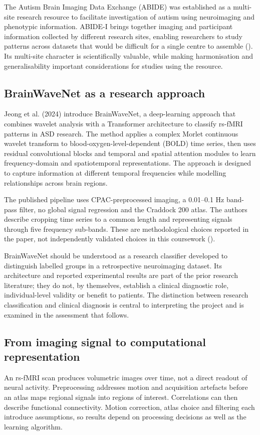 \documentclass[11pt,a4paper]{article}
\begin{document}
The Autism Brain Imaging Data Exchange (ABIDE) was established as a multi-site research resource to facilitate investigation of autism using neuroimaging and phenotypic information. ABIDE-I brings together imaging and participant information collected by different research sites, enabling researchers to study patterns across datasets that would be difficult for a single centre to assemble (\cite{dimartino2014,abidewebsite,abideharmonization2022}). Its multi-site character is scientifically valuable, while making harmonisation and generalisability important considerations for studies using the resource.

\subsection{BrainWaveNet as a research approach}
Jeong et al. (2024) introduce BrainWaveNet, a deep-learning approach that combines wavelet analysis with a Transformer architecture to classify rs-fMRI patterns in ASD research. The method applies a complex Morlet continuous wavelet transform to blood-oxygen-level-dependent (BOLD) time series, then uses residual convolutional blocks and temporal and spatial attention modules to learn frequency-domain and spatiotemporal representations. The approach is designed to capture information at different temporal frequencies while modelling relationships across brain regions.

The published pipeline uses CPAC-preprocessed imaging, a 0.01--0.1 Hz band-pass filter, no global signal regression and the Craddock 200 atlas. The authors describe cropping time series to a common length and representing signals through five frequency sub-bands. These are methodological choices reported in the paper, not independently validated choices in this coursework (\cite{jeong2024,abraham2017}).

BrainWaveNet should be understood as a research classifier developed to distinguish labelled groups in a retrospective neuroimaging dataset. Its architecture and reported experimental results are part of the prior research literature; they do not, by themselves, establish a clinical diagnostic role, individual-level validity or benefit to patients. The distinction between research classification and clinical diagnosis is central to interpreting the project and is examined in the assessment that follows.

\subsection{From imaging signal to computational representation}
An rs-fMRI scan produces volumetric images over time, not a direct readout of neural activity. Preprocessing addresses motion and acquisition artefacts before an atlas maps regional signals into regions of interest. Correlations can then describe functional connectivity. Motion correction, atlas choice and filtering each introduce assumptions, so results depend on processing decisions as well as the learning algorithm.
\end{document}

